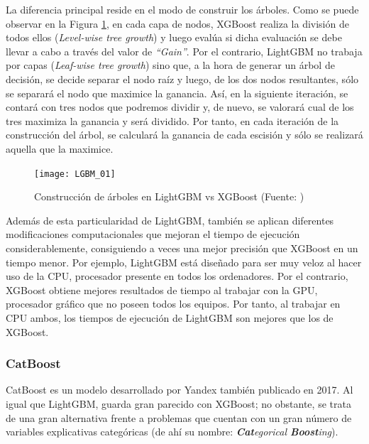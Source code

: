 \documentclass[12pt,twoside]{article}
\begin{document}
La diferencia principal reside en el modo de construir los árboles. Como se puede observar en la Figura \ref{fig:LGBM}, en cada capa de nodos, XGBoost realiza la división de todos ellos (\textit{Level-wise tree growth}) y luego evalúa si dicha evaluación se debe llevar a cabo a través del valor de \textit{``Gain''}. Por el contrario, LightGBM no trabaja por capas (\textit{Leaf-wise tree growth}) sino que, a la hora de generar un árbol de decisión, se decide separar el nodo raíz y luego, de los dos nodos resultantes, sólo se separará el nodo que maximice la ganancia. Así, en la siguiente iteración, se contará con tres nodos que podremos dividir y, de nuevo, se valorará cual de los tres maximiza la ganancia y será dividido. Por tanto, en cada iteración de la construcción del árbol, se calculará la ganancia de cada escisión y sólo se realizará aquella que la maximice.

\begin{figure}[h]
\centering
\texttt{[image: LGBM\_01]}
\caption{Construcción de árboles en LightGBM vs XGBoost (Fuente: \cite{MA01})}
\label{fig:LGBM}
\end{figure}


Además de esta particularidad de LightGBM, también se aplican diferentes modificaciones computacionales que mejoran el tiempo de ejecución considerablemente, consiguiendo a veces una mejor precisión que XGBoost en un tiempo menor. Por ejemplo, LightGBM está diseñado para ser muy veloz al hacer uso de la CPU, procesador presente en todos los ordenadores. Por el contrario, XGBoost obtiene mejores resultados de tiempo al trabajar con la GPU, procesador gráfico que no poseen todos los equipos. Por tanto, al trabajar en CPU ambos, los tiempos de ejecución de LightGBM son mejores que los de XGBoost.



\subsubsection{CatBoost} \label{sec:CatBoost}

CatBoost \cite{DO01} es un modelo desarrollado por Yandex también publicado en 2017. Al igual que LightGBM, guarda gran parecido con XGBoost; no obstante, se trata de una gran alternativa frente a problemas que cuentan con un gran número de variables explicativas categóricas (de ahí su nombre: \textit{\textbf{Cat}egorical \textbf{Boost}ing}).
\end{document}
